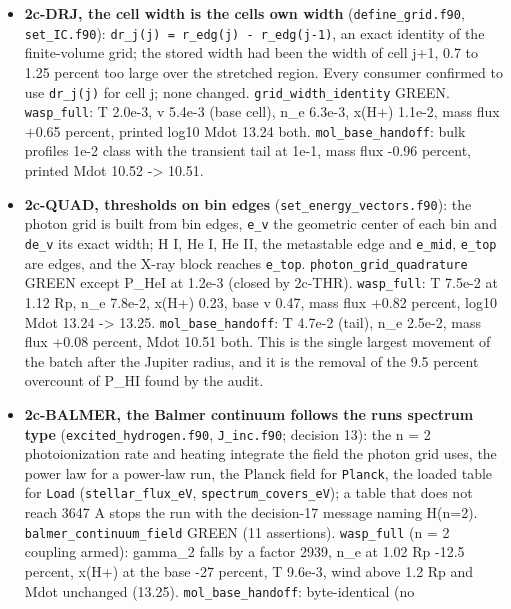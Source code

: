 \documentclass[english,a4paper]{my_memo}
\providecommand{\tightlist}{\setlength{\itemsep}{0pt}\setlength{\parskip}{0pt}}
\begin{document}
\begin{itemize}
\tightlist
\item
  \textbf{2c-DRJ, the cell width is the cell\textquotesingle s own width} (\texttt{define\_grid.f90},
  \texttt{set\_IC.f90}): \texttt{dr\_j(j)\ =\ r\_edg(j)\ -\ r\_edg(j-1)}, an exact identity of the
  finite-volume grid; the stored width had been the width of cell j+1, 0.7 to
  1.25 percent too large over the stretched region. Every consumer confirmed
  to use \texttt{dr\_j(j)} for cell j; none changed. \texttt{grid\_width\_identity} GREEN.
  \texttt{wasp\_full}: T 2.0e-3, v 5.4e-3 (base cell), n\_e 6.3e-3, x(H+) 1.1e-2,
  mass flux +0.65 percent, printed log10 Mdot 13.24 both. \texttt{mol\_base\_handoff}:
  bulk profiles 1e-2 class with the transient tail at 1e-1, mass flux -0.96
  percent, printed Mdot 10.52 -\textgreater{} 10.51.
\item
  \textbf{2c-QUAD, thresholds on bin edges} (\texttt{set\_energy\_vectors.f90}): the photon
  grid is built from bin edges, \texttt{e\_v} the geometric center of each bin and
  \texttt{de\_v} its exact width; H I, He I, He II, the metastable edge and \texttt{e\_mid},
  \texttt{e\_top} are edges, and the X-ray block reaches \texttt{e\_top}.
  \texttt{photon\_grid\_quadrature} GREEN except P\_HeI at 1.2e-3 (closed by 2c-THR).
  \texttt{wasp\_full}: T 7.5e-2 at 1.12 Rp, n\_e 7.8e-2, x(H+) 0.23, base v 0.47,
  mass flux +0.82 percent, log10 Mdot 13.24 -\textgreater{} 13.25. \texttt{mol\_base\_handoff}: T
  4.7e-2 (tail), n\_e 2.5e-2, mass flux +0.08 percent, Mdot 10.51 both. This
  is the single largest movement of the batch after the Jupiter radius, and
  it is the removal of the 9.5 percent overcount of P\_HI found by the audit.
\item
  \textbf{2c-BALMER, the Balmer continuum follows the run\textquotesingle s spectrum type}
  (\texttt{excited\_hydrogen.f90}, \texttt{J\_inc.f90}; decision 13): the n = 2
  photoionization rate and heating integrate the field the photon grid uses,
  the power law for a power-law run, the Planck field for \texttt{Planck}, the
  loaded table for \texttt{Load} (\texttt{stellar\_flux\_eV}, \texttt{spectrum\_covers\_eV}); a table
  that does not reach 3647 A stops the run with the decision-17 message
  naming H(n=2). \texttt{balmer\_continuum\_field} GREEN (11 assertions).
  \texttt{wasp\_full} (n = 2 coupling armed): gamma\_2 falls by a factor 2939, n\_e at
  1.02 Rp -12.5 percent, x(H+) at the base -27 percent, T 9.6e-3, wind above
  1.2 Rp and Mdot unchanged (13.25). \texttt{mol\_base\_handoff}: byte-identical (no

\end{itemize}
\end{document}
